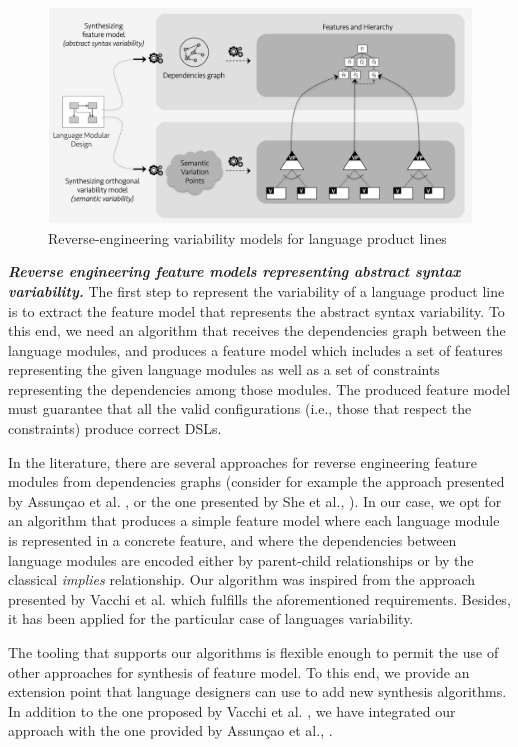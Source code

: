 \begin{figure}
\centering
\includegraphics[width=0.8\linewidth]{images/reverse-engineering-vm.png}
\caption{Reverse-engineering variability models for language product lines}
\label{fig:everse-engineering-vm}
\end{figure}

\vspace{2mm}
\textit{\textbf{Reverse engineering feature models representing abstract syntax variability.}} The first step to represent the variability of a language product line is to extract the feature model that represents the abstract syntax variability. To this end, we need an algorithm that receives the dependencies graph between the language modules, and produces a feature model which includes a set of features representing the given language modules as well as a set of constraints representing the dependencies among those modules. The produced feature model must guarantee that all the valid configurations (i.e., those that respect the constraints) produce correct DSLs.

In the literature, there are several approaches for reverse engineering feature modules from dependencies graphs (consider for example the approach presented by Assun\c{c}ao et al. \cite{Assuncao:2015}, or the one presented by She et al., \cite{She:2014}). In our case, we opt for an algorithm that produces a simple feature model where each language module is represented in a concrete feature, and where the dependencies between language modules are encoded either by parent-child relationships or by the classical \textit{implies} relationship. Our algorithm was inspired from the approach presented by Vacchi et al. \cite{Vacchi:2013} which fulfills the aforementioned requirements. Besides, it has been applied for the particular case of languages variability. 

The tooling that supports our algorithms is flexible enough to permit the use of other approaches for synthesis of feature model. To this end, we provide an extension point that language designers can use to add new synthesis algorithms. In addition to the one proposed by Vacchi et al. \cite{Vacchi:2013}, we have integrated our approach with the one provided by Assun\c{c}ao et al., \cite{Assuncao:2015}.


